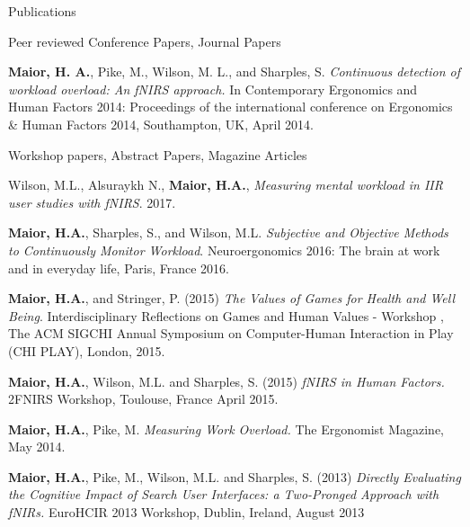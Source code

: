 \documentclass{resume} %
\begin{document}
\begin{rSection}{Publications}
\begin{rSubsection}{ }{ }{ }{Peer reviewed Conference Papers, Journal Papers}
			\item \textbf{Maior, H. A.}, Pike, M., Wilson, M. L., and Sharples, S. \emph{Continuous detection of workload overload: An fNIRS approach.} In Contemporary Ergonomics and Human Factors 2014: Proceedings of the international conference on Ergonomics \& Human Factors 2014, Southampton, UK, April 2014.
		\end{rSubsection}
		
		\begin{rSubsection}{ }{ }{ }{Workshop papers, Abstract Papers, Magazine Articles}
			
			\item Wilson, M.L., Alsuraykh N., \textbf{Maior, H.A.},  \emph{Measuring mental workload in IIR user studies with fNIRS}. 2017.
			\item \textbf{Maior, H.A.}, Sharples, S., and Wilson, M.L. \emph{Subjective and Objective Methods to Continuously Monitor Workload}. Neuroergonomics 2016: The brain at work and in everyday life, Paris, France 2016.
			\item \textbf{Maior, H.A.}, and Stringer, P. (2015) \emph{The Values of Games for Health and Well Being}. Interdisciplinary Reflections on Games and Human Values - Workshop , The ACM SIGCHI Annual Symposium on Computer-Human Interaction in Play (CHI PLAY), London, 2015.
			\item \textbf{Maior, H.A.}, Wilson, M.L. and Sharples, S. (2015) \emph{fNIRS in Human Factors.} 2FNIRS Workshop, Toulouse, France April 2015.
			\item \textbf{Maior, H.A.}, Pike, M. \emph{Measuring Work Overload.} The Ergonomist Magazine, May 2014.
			\item \textbf{Maior, H.A.}, Pike, M., Wilson, M.L. and Sharples, S. (2013) \emph{Directly Evaluating the Cognitive Impact of Search User Interfaces: a Two-Pronged Approach with fNIRs.} EuroHCIR 2013 Workshop, Dublin, Ireland, August 2013
		\end{rSubsection}
		
	\end{rSection}
	
\end{document}
